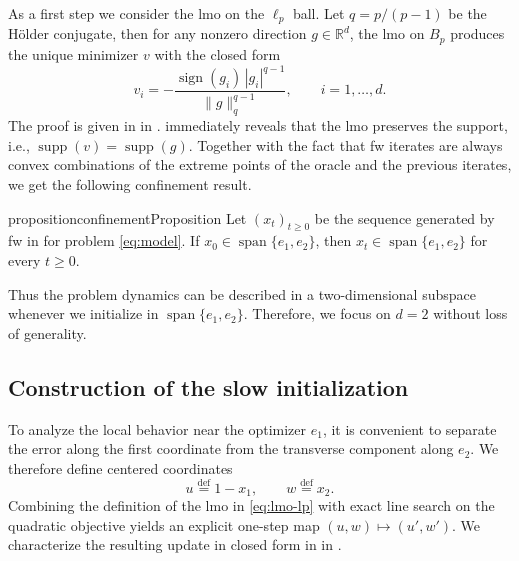 \documentclass{article}
\newcommand{\R}{\mathbb{R}}
\DeclareMathOperator{\spann}{span}
\DeclareMathOperator{\supp}{supp}
\newcommand{\norm}[1]{\|#1\|}
\newcommand\linktoproof[1]{{\hspace{-0.3em}\normalfont[{\hyperlink{proof:#1}{$\downarrow$}}]}}
\newcommand{\defi}{\stackrel{\mathrm{\scriptscriptstyle def}}{=}}
\begin{document}
As a first step we consider the \gls{lmo} on the $\ell_p$ ball.
Let $q=p/(p-1)$ be the H\"older conjugate, then for any nonzero direction $g\in\R^d$, the \gls{lmo} on $B_p$ produces the unique minimizer $v$ with the closed form
\begin{equation}
    v_i = -\frac{\operatorname{sign}(g_i)\,|g_i|^{q-1}}{\norm{g}_q^{q-1}},
    \qquad i=1,\dots,d.
    \label{eq:lmo-lp}
\end{equation}
The proof is given in  in .
 immediately reveals that the \gls{lmo} preserves the support, i.e., $\supp(v) = \supp(g)$.
Together with the fact that \gls{fw} iterates are always convex combinations of the extreme points of the oracle and the previous iterates, we get the following confinement result.
\begin{restatable}{proposition}{confinementProposition}\label{prop:confinement}\linktoproof{prop:confinement}
    Let $(x_t)_{t\ge 0}$ be the sequence generated by \gls{fw} in  for problem \eqref{eq:model}.
    If $x_0\in\spann\{e_1,e_2\}$, then $x_t\in\spann\{e_1,e_2\}$ for every $t\ge 0$.
\end{restatable}

Thus the problem dynamics can be described in a two-dimensional subspace whenever we initialize in $\spann\{e_1,e_2\}$.
Therefore, we focus on $d=2$ without loss of generality.

\subsection{Construction of the slow initialization}

To analyze the local behavior near the optimizer $e_1$, it is convenient to separate the error along the first coordinate from the transverse component along $e_2$.
We therefore define centered coordinates
\[
    u\defi 1-x_1,\qquad w\defi x_2.
\]
Combining the definition of the \gls{lmo} in \eqref{eq:lmo-lp} with exact line search on the quadratic objective yields an explicit one-step map $(u,w)\mapsto(u',w')$.
We characterize the resulting update in closed form in  in .
\end{document}
